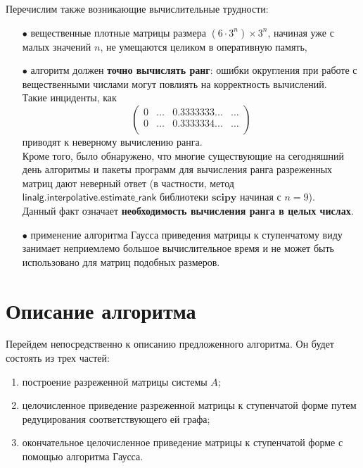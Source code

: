 \noindent Перечислим также возникающие вычислительные трудности:
\begin{itemize}
	\item[$\bullet$]{вещественные плотные матрицы размера $(6 \cdot 3^{n}) \times 3^{n}$, начиная уже с малых значений $n$, не умещаются целиком в оперативную память,}
	\item[$\bullet$]{алгоритм должен \textbf{точно вычислять ранг}: ошибки округления при работе с вещественными числами могут повлиять на корректность вы­числений.\\
		Такие инциденты, как
		\[
		\begin{pmatrix}
			0 & \dots & 0.3333333... & \dots \\
			0 & \dots & 0.3333334... & \dots \\
		\end{pmatrix}
		\]}приводят к неверному вычислению ранга.\\[0pt]

	Кроме того, было обнаружено, что многие существующие на сего­дняшний день алгоритмы и пакеты программ для вычисления ран­га разреженных матриц дают неверный ответ (в частности, метод $\mathsf{linalg.interpolative.estimate\_rank}$ библиотеки $\mathbf{scipy}$ начиная с $n = 9$).\\[18pt]
	Данный факт означает \textbf{необходимость вычисления ранга в целых числах}.
	\item[$\bullet$]{применение алгоритма Гаусса приведения матрицы к ступенчатому ви­ду занимает неприемлемо большое вычислительное время и не может быть использовано для матриц подобных размеров.}
\end{itemize}

\section{Описание алгоритма}\label{sec:ch4/sect3}

Перейдем непосредственно к описанию предложенного алгоритма.
Он будет состоять из трех частей:
\begin{enumerate}
	\item{построение разреженной матрицы системы $A$};
	\item{целочисленное приведение разреженной матрицы к ступенчатой форме путем редуцирования соответствующего ей графа};
	\item{окончательное целочисленное приведение матрицы к ступенчатой форме с помощью
		алгоритма Гаусса}.
\end{enumerate}

